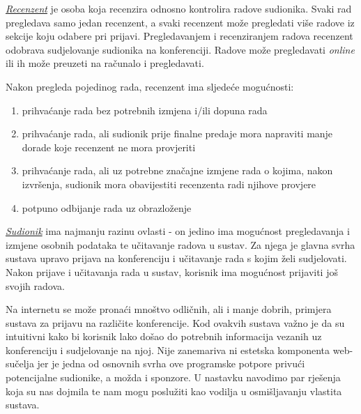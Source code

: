 		
		\underline{\textit{Recenzent}} je osoba koja recenzira odnosno kontrolira radove sudionika. Svaki rad pregledava samo jedan recenzent, a svaki recenzent može pregledati više radove iz sekcije koju odabere pri prijavi. Pregledavanjem i recenziranjem radova recenzent odobrava sudjelovanje sudionika na konferenciji. Radove može pregledavati \textit{online} ili ih može preuzeti na računalo i pregledavati. 
		
		Nakon pregleda pojedinog rada, recenzent ima sljedeće mogućnosti:
		
		\begin{enumerate}
			
			\item prihvaćanje rada bez potrebnih izmjena i/ili dopuna rada
			\item prihvaćanje rada, ali sudionik prije finalne predaje mora napraviti manje dorade koje recenzent ne mora provjeriti
			\item prihvaćanje rada, ali uz potrebne značajne izmjene rada o kojima, nakon izvršenja, sudionik mora obavijestiti recenzenta radi njihove provjere
			\item potpuno odbijanje rada uz obrazloženje
			
		\end{enumerate}
	
		\underline{\textit{Sudionik}} ima najmanju razinu ovlasti - on jedino ima mogućnost pregledavanja i izmjene osobnih podataka te učitavanje radova u sustav. Za njega je glavna svrha sustava upravo prijava na konferenciju i učitavanje rada s kojim želi sudjelovati. Nakon prijave i učitavanja rada u sustav, korisnik ima mogućnost prijaviti još svojih radova.
		
		Na internetu se može pronaći mnoštvo odličnih, ali i manje dobrih, primjera sustava za prijavu na različite konferencije. Kod ovakvih sustava važno je da su intuitivni kako bi korisnik lako došao do potrebnih informacija vezanih uz konferenciju i sudjelovanje na njoj. Nije zanemariva ni estetska komponenta web-sučelja jer je jedna od osnovnih svrha ove programske potpore privući potencijalne sudionike, a možda i sponzore. U nastavku navodimo par rješenja koja su nas dojmila te nam mogu poslužiti kao vodilja u osmišljavanju vlastita sustava.
	
		\eject
		
	